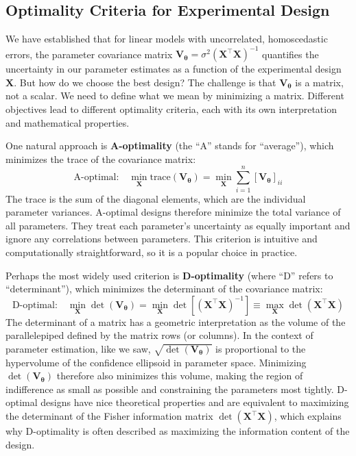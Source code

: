 \subsection{Optimality Criteria for Experimental Design}

We have established that for linear models with uncorrelated, homoscedastic errors, the parameter covariance matrix $\mathbf{V}_{\boldsymbol{\theta}} = \sigma^2 (\mathbf{X}^\top \mathbf{X})^{-1}$ quantifies the uncertainty in our parameter estimates as a function of the experimental design $\mathbf{X}$. But how do we choose the best design? The challenge is that $\mathbf{V}_{\boldsymbol{\theta}}$ is a matrix, not a scalar. We need to define what we mean by minimizing a matrix. Different objectives lead to different optimality criteria, each with its own interpretation and mathematical properties.

One natural approach is \textbf{A-optimality} (the ``A'' stands for ``average''), which minimizes the trace of the covariance matrix:
\begin{equation}
    \text{A-optimal:} \quad \min_{\mathbf{X}} \text{trace}(\mathbf{V}_{\boldsymbol{\theta}}) = \min_{\mathbf{X}} \sum_{i=1}^{n} [\mathbf{V}_{\boldsymbol{\theta}}]_{ii}
\end{equation}
The trace is the sum of the diagonal elements, which are the individual parameter variances. A-optimal designs therefore minimize the total variance of all parameters. They treat each parameter's uncertainty as equally important and ignore any correlations between parameters. This criterion is intuitive and computationally straightforward, so it is a popular choice in practice.

Perhaps the most widely used criterion is \textbf{D-optimality} (where ``D'' refers to ``determinant''), which minimizes the determinant of the covariance matrix:
\begin{equation}
    \text{D-optimal:} \quad \min_{\mathbf{X}} \det(\mathbf{V}_{\boldsymbol{\theta}}) = \min_{\mathbf{X}} \det\left[\left(\mathbf{X}^\top \mathbf{X}\right)^{-1}\right] \equiv \max_{\mathbf{X}} \det\left(\mathbf{X}^\top \mathbf{X}\right)
\end{equation}
The determinant of a matrix has a geometric interpretation as the volume of the parallelepiped defined by the matrix rows (or columns). In the context of parameter estimation, like we saw, $\sqrt{\det(\mathbf{V}_{\boldsymbol{\theta}})}$ is proportional to the hypervolume of the confidence ellipsoid in parameter space. Minimizing $\det(\mathbf{V}_{\boldsymbol{\theta}})$ therefore also minimizes this volume, making the region of indifference as small as possible and constraining the parameters most tightly. D-optimal designs have nice theoretical properties and are equivalent to maximizing the determinant of the Fisher information matrix $\det(\mathbf{X}^\top \mathbf{X})$, which explains why D-optimality is often described as maximizing the information content of the design.

